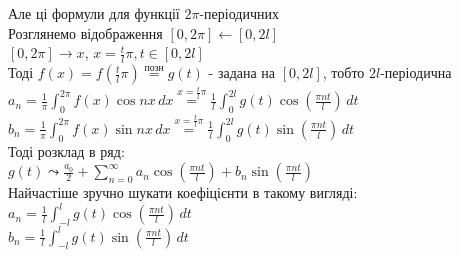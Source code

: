 \documentclass{math_library}
\begin{document}
Але ці формули для функції $2\pi$-періодичних
\bigskip \\
Розглянемо відображення $[0, 2\pi] \leftarrow [0, 2l]$\\
$[0, 2\pi] \rightarrow x$, $\displaystyle x = \frac{t}{l}\pi, t \in [0,2l]$\\
Тоді $\displaystyle f(x) = f(\frac{t}{l}\pi) \overset{\textrm{позн}}{=} g(t)$ - задана на $[0, 2l]$, тобто $2l$-періодична\\
$\displaystyle a_n = \frac{1}{\pi}\int_0^{2\pi} f(x) \cos nx \,dx \overset{\displaystyle x = \frac{t}{l} \pi}{=} \frac{1}{l} \int_0^{2l} g(t) \cos \left( \frac{\pi n t}{l} \right) \,dt$\\
$\displaystyle b_n = \frac{1}{\pi}\int_0^{2\pi} f(x) \sin nx \,dx \overset{\displaystyle x = \frac{t}{l} \pi}{=} \frac{1}{l} \int_0^{2l} g(t) \sin \left( \frac{\pi n t}{l} \right) \,dt$\\
Тоді розклад в ряд:\\
$\displaystyle g(t) \leadsto \displaystyle \frac{a_0}{2} + \sum_{n=0}^{\infty} a_n \cos \left( \frac{\pi n t}{l} \right) + b_n \sin \left( \frac{\pi n t}{l} \right)$\\
Найчастіше зручно шукати коефіцієнти в такому вигляді:\\
$\displaystyle a_n = \frac{1}{l} \int_{-l}^{l} g(t) \cos \left( \frac{\pi n t}{l} \right) \,dt$\\
$\displaystyle b_n = \frac{1}{l} \int_{-l}^{l} g(t) \sin \left( \frac{\pi n t}{l} \right) \,dt$
\bigskip \\
\end{document}
